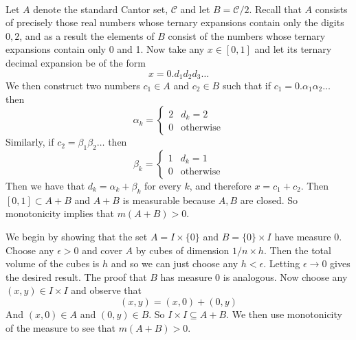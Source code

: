 \documentclass{article}
\newcommand{\problem}[1]{\noindent{\textbf{Problem #1}}\\}
\newcommand{\problempart}[1]{\noindent{\textbf{(#1)}}}
\begin{document}
\problem{1.6.20}
\problempart{a} Let $A$ denote the standard Cantor set, $\mathcal{C}$ and let $B = \mathcal{C}/2$. Recall that $A$ consists of precisely those real numbers whose ternary expansions contain only the digits $0,2$, and as a result the elements of $B$ consist of the numbers whose ternary expansions contain only 0 and 1. Now take any $x \in [0,1]$ and let its ternary decimal expansion be of the form 
\[
x = 0.d_1d_2d_3\ldots
\]
We then construct two numbers $c_1 \in A$ and $c_2 \in B$ such that if $c_1 = 0.\alpha_1\alpha_2\ldots$ then 
\[
\alpha_k = 
\begin{cases}
2 & d_k = 2\\
0 & \text{otherwise}
\end{cases}
\]
Similarly, if $c_2 = \beta_1\beta_2\ldots$ then 
\[
\beta_k = 
\begin{cases}
1 & d_k = 1\\
0 & \text{otherwise}
\end{cases}
\]
Then we have that $d_k = \alpha_k + \beta_k$ for every $k$, and therefore $x = c_1 + c_2$. Then $[0,1] \subset A+B$ and $A+B$ is measurable because $A,B$ are closed. So monotonicity implies that $m(A+B) > 0$. 

\problempart{b} We begin by showing that the set $A = I \times \{0\}$ and $B = \{0\} \times I$ have measure $0$. Choose any $\epsilon > 0$ and cover $A$ by cubes of dimension $1/n \times h$. Then the total volume of the cubes is $h$ and so we can just choose any $h < \epsilon$. Letting $\epsilon \to 0$ gives the desired result. The proof that $B$ has measure 0 is analogous. Now choose any $(x,y) \in I \times I$ and observe that 
\[
(x,y) = (x,0) + (0,y)
\]
And $(x,0) \in A$ and $(0,y) \in B$. So $I\times I \subseteq A+B$. We then use monotonicity of the measure to see that $m(A+B) > 0$. 
 
\end{document}
